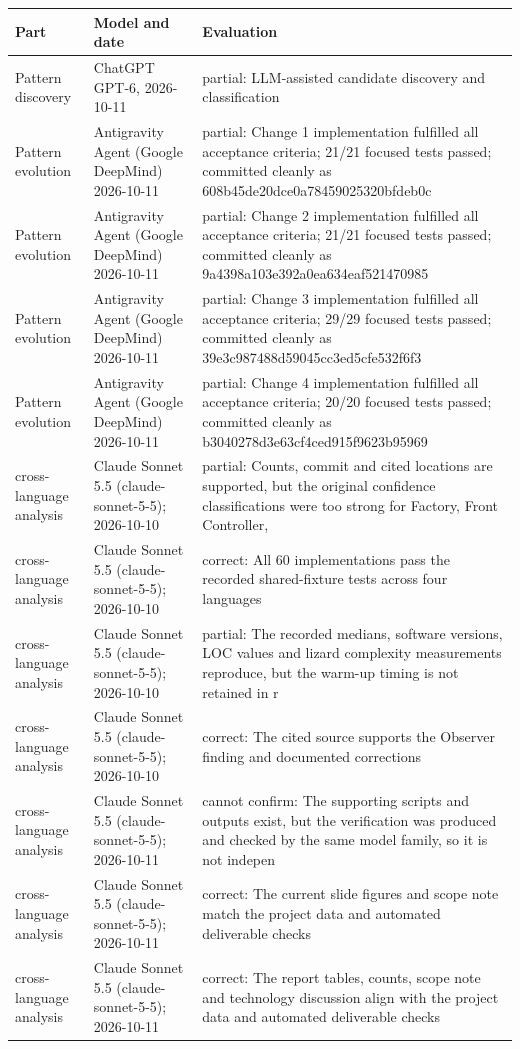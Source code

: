 \documentclass[11pt,a4paper]{article}
\begin{document}
{\small\begin{tabularx}{\linewidth}{llX}\toprule
Part & Model and date & Evaluation\\\midrule
Pattern discovery & ChatGPT GPT-6, 2026-10-11 & partial: LLM-assisted candidate discovery and classification \\
Pattern evolution & Antigravity Agent (Google DeepMind) 2026-10-11 & partial: Change 1 implementation fulfilled all acceptance criteria; 21/21 focused tests passed; committed cleanly as 608b45de20dce0a78459025320bfdeb0c \\
Pattern evolution & Antigravity Agent (Google DeepMind) 2026-10-11 & partial: Change 2 implementation fulfilled all acceptance criteria; 21/21 focused tests passed; committed cleanly as 9a4398a103e392a0ea634eaf521470985 \\
Pattern evolution & Antigravity Agent (Google DeepMind) 2026-10-11 & partial: Change 3 implementation fulfilled all acceptance criteria; 29/29 focused tests passed; committed cleanly as 39e3c987488d59045cc3ed5cfe532f6f3 \\
Pattern evolution & Antigravity Agent (Google DeepMind) 2026-10-11 & partial: Change 4 implementation fulfilled all acceptance criteria; 20/20 focused tests passed; committed cleanly as b3040278d3e63cf4ced915f9623b95969 \\
cross-language analysis & Claude Sonnet 5.5 (claude-sonnet-5-5); 2026-10-10 & partial: Counts, commit and cited locations are supported, but the original confidence classifications were too strong for Factory, Front Controller,  \\
cross-language analysis & Claude Sonnet 5.5 (claude-sonnet-5-5); 2026-10-10 & correct: All 60 implementations pass the recorded shared-fixture tests across four languages \\
cross-language analysis & Claude Sonnet 5.5 (claude-sonnet-5-5); 2026-10-10 & partial: The recorded medians, software versions, LOC values and lizard complexity measurements reproduce, but the warm-up timing is not retained in r \\
cross-language analysis & Claude Sonnet 5.5 (claude-sonnet-5-5); 2026-10-10 & correct: The cited source supports the Observer finding and documented corrections \\
cross-language analysis & Claude Sonnet 5.5 (claude-sonnet-5-5); 2026-10-11 & cannot confirm: The supporting scripts and outputs exist, but the verification was produced and checked by the same model family, so it is not indepen \\
cross-language analysis & Claude Sonnet 5.5 (claude-sonnet-5-5); 2026-10-11 & correct: The current slide figures and scope note match the project data and automated deliverable checks \\
cross-language analysis & Claude Sonnet 5.5 (claude-sonnet-5-5); 2026-10-11 & correct: The report tables, counts, scope note and technology discussion align with the project data and automated deliverable checks\\
\bottomrule\end{tabularx}}
\end{document}
